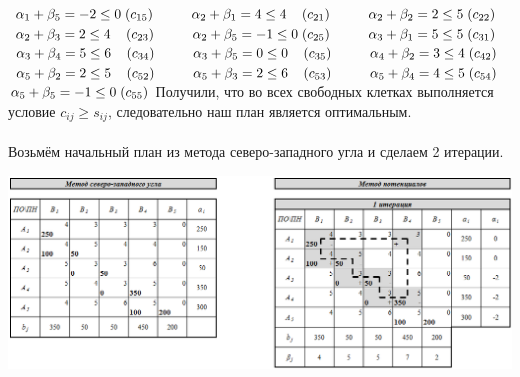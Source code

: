 \documentclass[14pt,a4paper,fleqn]{extarticle}
\begin{document}
$\alpha_1 + \beta_5 = -2 \leq 0 \hspace*{0.1cm} (c_{15}) \hspace*{1cm} \alpha_2 + \beta_1 = 4 \leq 4 \hspace*{0.4cm} (c_{21}) \hspace*{1cm} \alpha_2 + \beta_2 = 2 \leq 5 \hspace*{0.1cm} (c_{22})$\\
$\alpha_2 + \beta_3 = 2 \leq 4 \hspace*{0.4cm} (c_{23}) \hspace*{1cm} \alpha_2 + \beta_5 = -1 \leq 0 \hspace*{0.1cm} (c_{25}) \hspace*{1cm} \alpha_3 + \beta_1 = 5 \leq 5 \hspace*{0.1cm} (c_{31})$\\
$\alpha_3 + \beta_4 = 5 \leq 6 \hspace*{0.4cm} (c_{34}) \hspace*{1cm} \alpha_3 + \beta_5 = 0 \leq 0 \hspace*{0.4cm} (c_{35}) \hspace*{1cm} \alpha_4 + \beta_2 = 3 \leq 4 \hspace*{0.1cm} (c_{42})$\\
$\alpha_5 + \beta_2 = 2 \leq 5 \hspace*{0.4cm} (c_{52}) \hspace*{1cm} \alpha_5 + \beta_3 = 2 \leq 6 \hspace*{0.4cm} (c_{53}) \hspace*{1cm} \alpha_5 + \beta_4 = 4 \leq 5 \hspace*{0.1cm} (c_{54})$\\
$\alpha_5 + \beta_5 = -1 \leq 0 \hspace*{0.1cm} (c_{55})$
\newpage
Получили, что во всех свободных клетках выполняется условие $c_{ij} \geq s_{ij}$, следовательно наш план является оптимальным.\\\\
Возьмём начальный план из метода северо-западного угла и сделаем 2 итерации.
\begin{center}
	\includegraphics[scale=0.45]{36}
\end{center}
\end{document}
